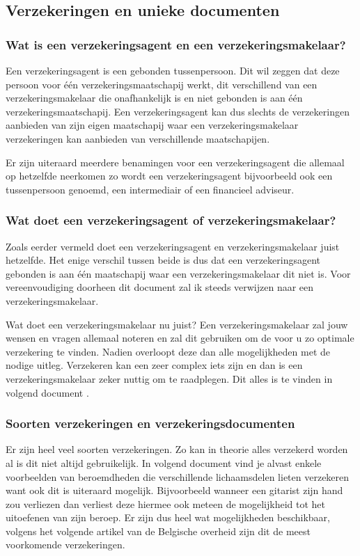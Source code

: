 \subsection{Verzekeringen en unieke documenten}
\subsubsection{Wat is een verzekeringsagent en een verzekeringsmakelaar?}
Een verzekeringsagent is een gebonden tussenpersoon. Dit wil zeggen dat deze persoon voor één verzekeringsmaatschapij werkt, dit verschillend van een verzekeringsmakelaar die onafhankelijk is en niet gebonden is aan één verzekeringsmaatschapij. Een verzekeringsagent kan dus slechts de verzekeringen aanbieden van zijn eigen maatschapij waar een verzekeringsmakelaar verzekeringen kan aanbieden van verschillende maatschapijen. 

Er zijn uiteraard meerdere benamingen voor een verzekeringsagent die allemaal op hetzelfde neerkomen zo wordt een verzekeringsagent bijvoorbeeld ook een tussenpersoon genoemd, een intermediair of een financieel adviseur. 

\subsubsection{Wat doet een verzekeringsagent of verzekeringsmakelaar?}
Zoals eerder vermeld doet een verzekeringsagent en verzekeringsmakelaar juist hetzelfde. Het enige verschil tussen beide is dus dat een verzekeringsagent gebonden is aan één maatschapij waar een verzekeringsmakelaar dit niet is. Voor vereenvoudiging doorheen dit document zal ik steeds verwijzen naar een verzekeringsmakelaar. 

Wat doet een verzekeringsmakelaar nu juist? Een verzekeringsmakelaar zal jouw wensen en vragen allemaal noteren en zal dit gebruiken om de voor u zo optimale verzekering te vinden. Nadien overloopt deze dan alle mogelijkheden met de nodige uitleg. Verzekeren kan een zeer complex iets zijn en dan is een verzekeringsmakelaar zeker nuttig om te raadplegen. Dit alles is te vinden in volgend document \textcite{Verzekeruzelf.nl}.

\subsubsection{Soorten verzekeringen en verzekeringsdocumenten}
Er zijn heel veel soorten verzekeringen. Zo kan in theorie alles verzekerd worden al is dit niet altijd gebruikelijk. In volgend document \textcite{verzekeringen.com2015} vind je alvast enkele voorbeelden van beroemdheden die verschillende lichaamsdelen lieten verzekeren want ook dit is uiteraard mogelijk. Bijvoorbeeld wanneer een gitarist zijn hand zou verliezen dan verliest deze hiermee ook meteen de mogelijkheid tot het uitoefenen van zijn beroep. Er zijn dus heel wat mogelijkheden beschikbaar, volgens het volgende artikel \textcite{BFOverzekeringen} van de Belgische overheid zijn dit de meest voorkomende verzekeringen.

